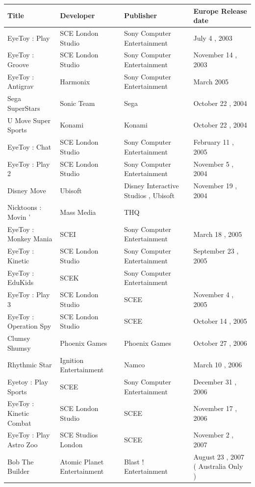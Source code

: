 \documentclass{article}
\begin{document}
\begin{tabular}{llll}
\toprule
Title & Developer & Publisher & Europe Release date \\
\midrule
EyeToy : Play & SCE London Studio & Sony Computer Entertainment & July 4 , 2003 \\
EyeToy : Groove & SCE London Studio & Sony Computer Entertainment & November 14 , 2003 \\
EyeToy : Antigrav & Harmonix & Sony Computer Entertainment & March 2005 \\
Sega SuperStars & Sonic Team & Sega & October 22 , 2004 \\
U Move Super Sports & Konami & Konami & October 22 , 2004 \\
EyeToy : Chat & SCE London Studio & Sony Computer Entertainment & February 11 , 2005 \\
EyeToy : Play 2 & SCE London Studio & Sony Computer Entertainment & November 5 , 2004 \\
Disney Move & Ubisoft & Disney Interactive Studios , Ubisoft & November 19 , 2004 \\
Nicktoons : Movin ' & Mass Media & THQ &  \\
EyeToy : Monkey Mania & SCEI & Sony Computer Entertainment & March 18 , 2005 \\
EyeToy : Kinetic & SCE London Studio & Sony Computer Entertainment & September 23 , 2005 \\
EyeToy : EduKids & SCEK & Sony Computer Entertainment &  \\
EyeToy : Play 3 & SCE London Studio & SCEE & November 4 , 2005 \\
EyeToy : Operation Spy & SCE London Studio & SCEE & October 14 , 2005 \\
Clumsy Shumsy & Phoenix Games & Phoenix Games & October 27 , 2006 \\
Rhythmic Star & Ignition Entertainment & Namco & March 10 , 2006 \\
Eyetoy : Play Sports & SCEE & Sony Computer Entertainment & December 31 , 2006 \\
EyeToy : Kinetic Combat & SCE London Studio & SCEE & November 17 , 2006 \\
EyeToy : Play Astro Zoo & SCE Studios London & SCEE & November 2 , 2007 \\
Bob The Builder & Atomic Planet Entertainment & Blast ! Entertainment & August 23 , 2007 ( Australia Only ) \\
\bottomrule
\end{tabular}
\end{document}
